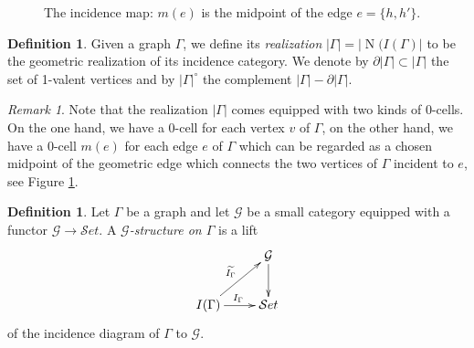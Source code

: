 \documentclass[english,11pt,leqno]{article}
\def\N{\operatorname{N}}
\def\Set{ {\mathcal Set}}
\def\Set{ {\mathcal Set}}
\def\G{ {\mathcal G}}
\theoremstyle{definition}
\newtheorem{defi}[thm]{Definition}
\theoremstyle{remark}
\newtheorem{rem}[thm]{Remark}
\numberwithin{equation}{section}
\begin{document}
\begin{figure}[h!]
\centering
\caption{The incidence map: $m(e)$ is the midpoint of the edge $e=\{h,h'\}$. }
\label{fig:F1}
\end{figure}

\begin{defi}
	Given a graph $\Gamma$, we define its {\em realization} $|\Gamma| = |\N(I(\Gamma)|$ to be
	the geometric realization of its incidence category. We denote by $\partial |\Gamma|\subset|\Gamma|$ 
	the set of 1-valent vertices and by $|\Gamma|^\circ$ the complement $|\Gamma| - \partial|\Gamma|$. 
\end{defi}

\begin{rem}\label{rem:midpoint}
 	Note that the realization $|\Gamma|$ comes equipped with two kinds
	of $0$-cells. On the one hand, we have a $0$-cell for each vertex $v$ of $\Gamma$, on the
	other hand, we have a $0$-cell $m(e)$ for each edge $e$ of $\Gamma$ which can be regarded as a
	chosen midpoint of the geometric edge which connects the two vertices of $\Gamma$ incident
	to $e$, see Figure \ref{fig:F1}. 
\end{rem}

\begin{defi} \label{defi:ggraph} Let $\Gamma$ be a graph and let $\G$ be a small category equipped with a functor $\G
	\to \Set$. A {\em $\G$-structure on $\Gamma$} is a lift 
	\[
	\xymatrix{
			& \G \ar[d] \\
			I(\Gamma) \ar[r]^{I_{\Gamma}} \ar[ur]^{\widetilde{I_{\Gamma}}} & \Set
	}
	\]
	of the incidence diagram of $\Gamma$ to $\G$. 
\end{defi}
\end{document}
